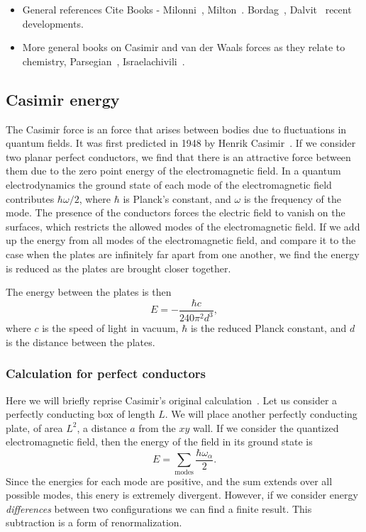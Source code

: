 \begin{itemize}
\item General references Cite Books - Milonni~\cite{Milonni1994}, Milton~\cite{Milton2001}.
  Bordag~\cite{Bordag2009}, Dalvit~\cite{Dalvit2011} recent developments.  
\item More general books on Casimir and van der Waals forces as they relate to chemistry, 
  Parsegian~\cite{Parsegian2006}, Israelachivili~\cite{Israelachvili2011}.
\end{itemize}


\subsection{Casimir energy}

The Casimir force is an force that arises between bodies due to fluctuations in quantum fields.
  It was first predicted in 1948 by Henrik Casimir~\cite{Casimir1948}.
  If we consider two planar perfect conductors, we find that there is an 
attractive force between them due to the zero point energy of the electromagnetic field.
  In a quantum electrodynamics the ground state of each mode of the 
electromagnetic field contributes $\hbar\omega/2$, where $\hbar$ is Planck's
 constant, and $\omega$ is the frequency of the mode.
  The presence of the conductors forces the electric field to vanish on the surfaces,
 which restricts the allowed modes of the electromagnetic field.  
If we add up the energy from all modes of the electromagnetic field, 
and compare it to the case when the plates are infinitely far apart from one another, 
we find the energy is reduced as the plates are brought closer together.

  The energy between the plates is then
\begin{equation}
  E = -\frac{\hbar c}{240\pi^2 d^3},
\end{equation}
where $c$ is the speed of light in vacuum, $\hbar$ is the reduced Planck constant,
and $d$ is the distance between the plates.  

\subsubsection{Calculation for perfect conductors}

Here we will briefly reprise Casimir's original calculation~\cite{Casimir1948}.
  Let us consider a perfectly conducting box of length $L$.
  We will place another perfectly conducting plate, of area $L^2$, a distance $a$ from the $xy$ wall.   
If we consider the quantized electromagnetic field,  
then the energy of the field in its ground state is
\begin{equation}
E = \sum_{\text{modes}}\frac{\hbar\omega_\alpha}{2}.
\end{equation}
Since the energies for each mode are positive, and the sum extends over all possible modes,
 this enery is extremely divergent.
  However, if we consider energy \emph{differences} between two configurations 
we can find a finite result.  
This subtraction is a form of renormalization.  

